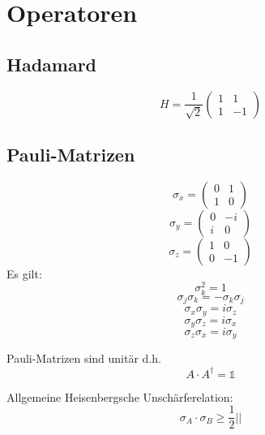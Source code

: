 \documentclass{article}
\begin{document}
\section{Operatoren}
\subsection{Hadamard}

\[ H = \frac{1}{\sqrt{2}}\left(\begin{array}{rr}
    1 &  1\\
    1 & -1
  \end{array}\right) \]
\subsection{Pauli-Matrizen}
\[ \sigma_x = \left(\begin{array}{rr}
    0 & 1\\
    1 & 0
  \end{array} \right) \]
\[ \sigma_y = \left(\begin{array}{rr}
    0 & -i\\
    i & 0
  \end{array} \right) \]
\[ \sigma_z = \left(\begin{array}{rr}
    1 & 0\\
    0 & -1
  \end{array}\right) \]
Es gilt:
\[ \sigma_k^2 = 1 \]
\[ \sigma_j\sigma_k = -\sigma_k\sigma_j \]
\[ \sigma_x\sigma_y = i\sigma_z \]
\[ \sigma_y\sigma_z = i\sigma_x \]
\[ \sigma_z\sigma_x = i\sigma_y \]

Pauli-Matrizen sind unitär d.h. 
\[ A \cdot A^{\dagger} = \mathbb{1} \]


Allgemeine Heisenbergsche Unschärferelation:
\[ \sigma_A \cdot \sigma_B \ge \frac{1}{2} || \]

  
\end{document}
